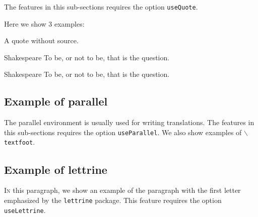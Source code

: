 \documentclass[layout=rotate,useSpeTable,useQuote,useParallel,useLettrine]{CKAgn}
\begin{document}
The features in this sub-sections requires the option \texttt{useQuote}.

Here we show 3 examples:

\begin{shadeQuote}{}
  A quote without source.
\end{shadeQuote}

\begin{shadeQuote}{Shakespeare}
  To be, or not to be, that is the question.
\end{shadeQuote}

\begin{shadeQuote}[r]{Shakespeare}
  To be, or not to be, that is the question.
\end{shadeQuote}

\subsection{Example of parallel}

The parallel environment is usually used for writing translations. The features in this sub-sections requires the option \texttt{useParallel}. We also show examples of \texttt{$\backslash$textfoot}.

\begin{Parallel}[v]{0.42\textwidth}{0.52\textwidth}
  \litem{\lipsum[2]}
  \litem{\lipsum[4]}
  \ritem{\lipsum[5]}
\end{Parallel}

\subsection{Example of lettrine}

\lettrine{I}{n} this paragraph, we show an example of the paragraph with the first letter emphasized by the \texttt{lettrine} package. This feature requires the option \texttt{useLettrine}.
\end{document}
